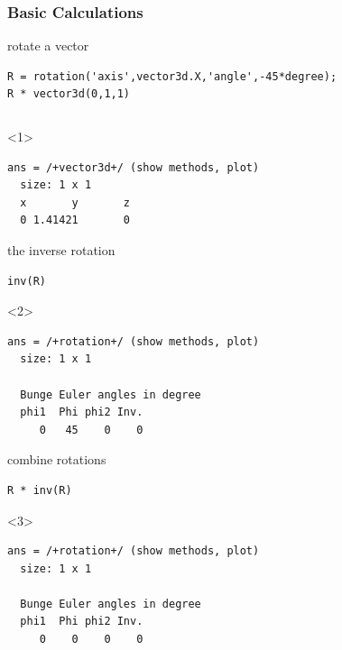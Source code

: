\documentclass[compress]{beamer}
\begin{document}
\begin{frame}[fragile]
  \frametitle{Basic Calculations}

    rotate a vector
    \begin{lstlisting}[style=input]
R = rotation('axis',vector3d.X,'angle',-45*degree);
R * vector3d(0,1,1)
    \end{lstlisting}


  \begin{columns}
    \begin{column}{8cm}
  \begin{overlayarea}{8cm}{8cm}
\begin{onlyenv}<1>
  \vspace{-0.3cm}
\begin{lstlisting}[style=output]
ans = /+vector3d+/ (show methods, plot)
  size: 1 x 1
  x       y       z
  0 1.41421       0
  \end{lstlisting}
\end{onlyenv}

\pause
 \medskip

 the inverse rotation
 \begin{lstlisting}[style=input]
 inv(R)
 \end{lstlisting}
 \begin{onlyenv}<2>
   \vspace{-0.3cm}
  \begin{lstlisting}[style=output]
ans = /+rotation+/ (show methods, plot)
  size: 1 x 1

  Bunge Euler angles in degree
  phi1  Phi phi2 Inv.
     0   45    0    0
  \end{lstlisting}
 \end{onlyenv}

 \pause
 \medskip

 combine rotations
 \begin{lstlisting}[style=input]
R * inv(R)
\end{lstlisting}

\begin{onlyenv}<3>
  \vspace{-0.3cm}
  \begin{lstlisting}[style=output]
ans = /+rotation+/ (show methods, plot)
  size: 1 x 1

  Bunge Euler angles in degree
  phi1  Phi phi2 Inv.
     0    0    0    0
  \end{lstlisting}
\end{onlyenv}

\pause
\medskip


\end{overlayarea}
\end{column}
\end{columns}
\end{frame}
\end{document}
